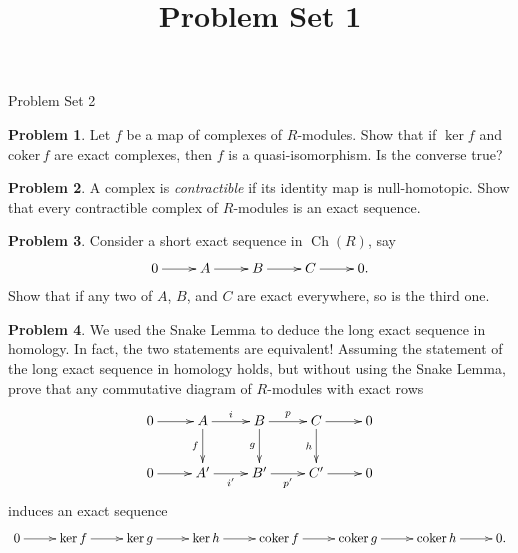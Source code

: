 \documentclass[11pt]{article}
\title{}
\date{\vspace{-0.5in}}
\title{Problem Set 1}
\DeclareMathOperator{\Ch}{Ch}
\DeclareMathOperator{\coker}{coker}
\theoremstyle{definition}
\newtheorem{problem}{Problem}
\begin{document}
\thispagestyle{fancy}
\pagestyle{fancy}


\begin{center}
	{\LARGE Problem Set 2}
\end{center}



\begin{problem}
	Let $f$ be a map of complexes of $R$-modules. Show that if $\ker f$ and $\textrm{coker}\, f$ are exact complexes, then $f$ is a quasi-isomorphism. Is the converse true?
\end{problem}


\begin{problem}
	A complex is \emph{contractible} if its identity map is null-homotopic. Show that every contractible complex of $R$-modules is an exact sequence.
\end{problem}


\begin{problem}
	Consider a short exact sequence in $\Ch(R)$, say
	$$\xymatrix{0 \ar[r] & A \ar[r] & B \ar[r] & C \ar[r] & 0.}$$
	Show that if any two of $A$, $B$, and $C$ are exact everywhere, so is the third one.
\end{problem}


\begin{problem}
	We used the Snake Lemma to deduce the long exact sequence in homology. In fact, the two statements are equivalent! Assuming the statement of the long exact sequence in homology holds, but without using the Snake Lemma, prove that any commutative diagram of $R$-modules with exact rows
	$$\xymatrix{0 \ar[r] & A \ar[d]_-f
	\ar[r]^-i & B \ar[r]^-p \ar[d]_-g & C \ar[r] \ar[d]_-h & 0 \\ 0 \ar[r] & A'
	\ar[r]_-{i'} & B' \ar[r]_-{p'} & C' \ar[r] & 0}$$
	induces an exact sequence
	$$\xymatrix{0 \ar[r] & \ker f \ar[r] & \ker g \ar[r] & \ker h \ar[r] & \coker f \ar[r] & \coker g \ar[r] & \coker h \ar[r] & 0.}$$
\end{problem}


\vfill

\noindent
{} 
\end{document}
